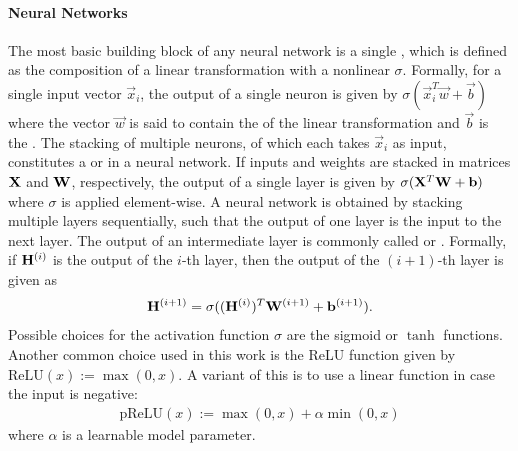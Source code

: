 \documentclass[
	fontsize=10pt, %
	twoside=false, %
	secnumdepth=1, %
  toc=indentunnumbered %
]{kaobook}
\begin{document}
\paragraph{Neural Networks}
The most basic building block of any neural network is a single ,
which is defined as the composition of a linear transformation with a nonlinear
 $\sigma$. Formally, for a single input vector $\vec
x_i$, the output of a single neuron is given by $\sigma(\vec x_i^T \vec w + \vec
b)$ where the vector $\vec w$ is said to contain the  of the linear
transformation and $\vec b$ is the . The stacking of multiple neurons,
of which each takes $\vec x_i$ as input, constitutes a  or
  in a neural network. If inputs and weights are stacked
in matrices $\mathbf{X}$ and $\mathbf{W}$, respectively, the output of a single layer is
given by $\sigma(\mathbf{X}^T \mathbf{W} + \mathbf{b})$ where $\sigma$ is applied
element-wise.
%
A neural network is obtained by stacking multiple layers sequentially, such that
the output of one layer is the input to the next layer. The output of an
intermediate layer is commonly called  or 
. Formally, if $\mathbf{H}^{(i)}$ is the output of the $i$-th layer,
then the output of the $(i+1)$-th layer is given as
\begin{align}
\mathbf{H}^{(i+1)} = \sigma((\mathbf{H}^{(i)})^T \mathbf{W}^{(i+1)} + \mathbf{b}^{(i+1)}).
\label{eq:fully-connected}
\end{align}
%
Possible choices for the activation function $\sigma$ are the sigmoid or $\tanh$
functions. Another common choice used in this work is the ReLU function given by
$\text{ReLU}(x) := \max(0,x)$. A variant of this is to use a linear function in
case the input is negative:
\begin{align}
  \label{eq:prelu}
  \text{pReLU}(x) := \max(0,x) + \alpha \min(0,x)
\end{align}
where $\alpha$ is a learnable model parameter.
\end{document}
